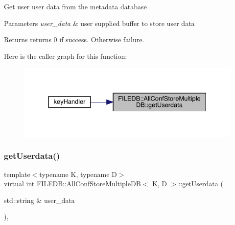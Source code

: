 Get user user data from the metadata database


\begin{DoxyParams}{Parameters}
{\em user\+\_\+data} & user supplied buffer to store user data \\
\hline
\end{DoxyParams}
\begin{DoxyReturn}{Returns}
returns 0 if success. Otherwise failure. 
\end{DoxyReturn}
Here is the caller graph for this function\+:\nopagebreak
\begin{figure}[H]
\begin{center}
\leavevmode
\includegraphics[width=330pt]{d5/dbe/classFILEDB_1_1AllConfStoreMultipleDB_a9a314fba1056c35ffe54e35e98e83523_icgraph}
\end{center}
\end{figure}
\mbox{\label{classFILEDB_1_1AllConfStoreMultipleDB_a9a314fba1056c35ffe54e35e98e83523}} 
\subsubsection{\texorpdfstring{getUserdata()}{getUserdata()}\hspace{0.1cm}{\footnotesize\ttfamily [2/2]}}
{\footnotesize\ttfamily template$<$typename K, typename D$>$ \\
virtual int \mbox{\hyperlink{classFILEDB_1_1AllConfStoreMultipleDB}{F\+I\+L\+E\+D\+B\+::\+All\+Conf\+Store\+Multiple\+DB}}$<$ K, D $>$\+::get\+Userdata (\begin{DoxyParamCaption}\item[{std\+::string \&}]{user\+\_\+data }\end{DoxyParamCaption})\hspace{0.3cm}{\ttfamily [inline]}, {\ttfamily [virtual]}}

